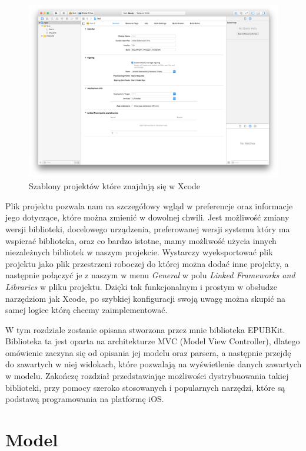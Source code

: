 \begin{figure}[ht!]
  \centering
  \includegraphics[width=120mm]{images/chapter-4-image-2-empty-project.png}
  \caption{Szablony projektów które znajdują się w Xcode}
  \label{chapter-4-image-2-empty-project}
\end{figure}

Plik projektu pozwala nam na szczegółowy wgląd w preferencje oraz informacje jego dotyczące, które można zmienić w dowolnej chwili. Jest możliwość zmiany wersji biblioteki, docelowego urządzenia, preferowanej wersji systemu który ma wspierać biblioteka, oraz co bardzo istotne, mamy możliwość użycia innych niezależnych bibliotek w naszym projekcie. Wystarczy wyeksportować plik projektu jako plik przestrzeni roboczej do której można dodać inne projekty, a następnie połączyć je z naszym w menu \textit{General} w polu \textit{Linked Frameworks and Libraries} w pliku projektu. Dzięki tak funkcjonalnym i prostym w obsłudze narzędziom jak Xcode, po szybkiej konfiguracji swoją uwagę można skupić na samej logice którą chcemy zaimplementować.

W tym rozdziale zostanie opisana stworzona przez mnie biblioteka EPUBKit. Biblioteka ta jest oparta na architekturze MVC (Model View Controller), dlatego omówienie zaczyna się od opisania jej modelu oraz parsera, a następnie przejdę do zawartych w niej widokach, które pozwalają na wyświetlenie danych zawartych w modelu. Zakończę rozdział przedstawiając możliwości dystrybuowania takiej biblioteki, przy pomocy szeroko stosowanych i popularnych narzędzi, które są podstawą programowania na platformę iOS.

\section{Model}


